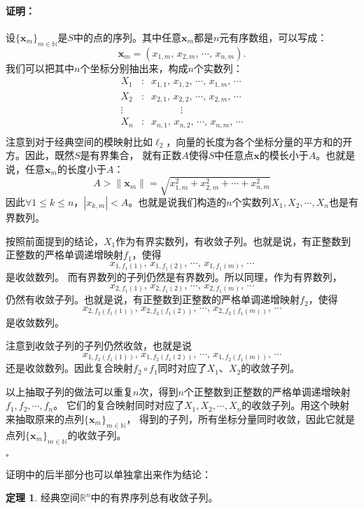 \documentclass[12pt,UTF8]{ctexbook}
\theoremstyle{definition}
\newtheorem{tm}{定理}[section]
\theoremstyle{plain}
\renewenvironment{proof}{\paragraph{\textbf{证明：}}}{\hfill$\square$}
\begin{document}
\begin{appendix}
\begin{proof}
    设$\{\mathbf{x}_m\}_{m\in\mathbb{N}}$是$S$中的点的序列。其中任意$\mathbf{x}_m$都是$n$元有序数组，可以写成：
    $$ \mathbf{x}_m = (x_{1,m},\, x_{2,m},\,\cdots, \, x_{n,m}). $$
    我们可以把其中$n$个坐标分别抽出来，构成$n$个实数列：
    \begin{align*}
        X_1 &:\;\; x_{1,1}, \, x_{1,2},\, \cdots, \, x_{1,m}, \, \cdots \\
        X_2 &:\;\; x_{2,1}, \, x_{2,2},\, \cdots, \, x_{2,m}, \, \cdots \\
        \vdots& \qquad \qquad \vdots \\
        X_n &:\;\; x_{n,1}, \, x_{n,2},\, \cdots, \, x_{n,m}, \, \cdots \\
    \end{align*}
    注意到对于经典空间的模映射比如$\ell_2$，向量的长度为各个坐标分量的平方和的开方。因此，既然$S$是有界集合，
    就有正数$A$使得$S$中任意点$\mathbf{x}$的模长小于$A$。也就是说，任意$\mathbf{x}_m$的长度小于$A$：
    $$ A > \| \mathbf{x}_m \| = \sqrt{x_{1,m}^2 +  x_{2,m}^2 + \cdots + x_{n,m}^2}$$
    因此$\forall 1\leqslant k \leqslant n$，$|x_{k,m}| < A$。也就是说我们构造的$n$个实数列$X_1,X_2,\cdots,X_n$也是有界数列。

    按照前面提到的结论，$X_1$作为有界实数列，有收敛子列。也就是说，有正整数到正整数的严格单调递增映射$f_1$，使得
    $$ x_{1,f_1(1)}, \, x_{1,f_1(2)},\, \cdots, \, x_{1,f_1(m)}, \, \cdots $$
    是收敛数列。
    而有界数列的子列仍然是有界数列。所以同理，作为有界数列，
    $$ x_{2,f_1(1)}, \, x_{2,f_1(2)},\, \cdots, \, x_{2,f_1(m)}, \, \cdots $$
    仍然有收敛子列。也就是说，有正整数到正整数的严格单调递增映射$f_2$，使得
    $$ x_{2,f_2(f_1(1))}, \, x_{2,f_2(f_1(2))},\, \cdots, \, x_{2,f_2(f_1(m))}, \, \cdots $$
    是收敛数列。

    注意到收敛子列的子列仍然收敛，也就是说
    $$ x_{1,f_2(f_1(1))}, \, x_{1,f_2(f_1(2))},\, \cdots, \, x_{1,f_2(f_1(m))}, \, \cdots $$
    还是收敛数列。因此复合映射$f_2\circ f_1$同时对应了$X_1$、$X_2$的收敛子列。

    以上抽取子列的做法可以重复$n$次，得到$n$个正整数到正整数的严格单调递增映射$f_1, f_2, \cdots ,f_n$。
    它们的复合映射同时对应了$X_1,X_2,\cdots,X_n$的收敛子列。用这个映射来抽取原来的点列$\{\mathbf{x}_m\}_{m\in\mathbb{N}}$，
    得到的子列，所有坐标分量同时收敛，因此它就是点列$\{\mathbf{x}_m\}_{m\in\mathbb{N}}$的收敛子列。

\end{proof}

证明中的后半部分也可以单独拿出来作为结论：
\begin{tm}
    经典空间$\mathbb{R}^n$中的有界序列总有收敛子列。
\end{tm}


\end{appendix}
\end{document}
